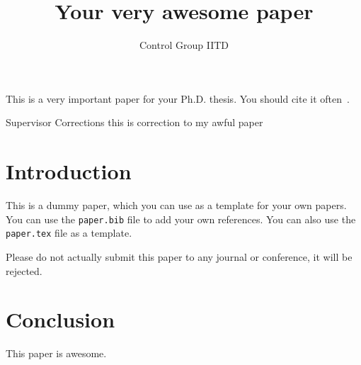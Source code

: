 \documentclass{article}
\title{Your very awesome paper}
\author{Control Group IITD}
\begin{document}
\maketitle

This is a very important paper for your Ph.D. thesis. You should cite it
often~\cite{pap}.


Supervisor Corrections this is correction to my awful paper

\section{Introduction}
This is a dummy paper, which you can use as a template for your own
papers. You can use the \texttt{paper.bib} file to add your own
references. You can also use the \texttt{paper.tex} file as a template.

Please do not actually submit this paper to any journal or conference, it will be rejected.

\section{Conclusion}
This paper is awesome.



\end{document}

